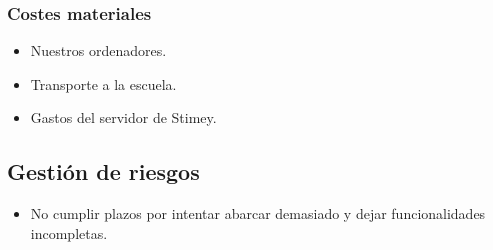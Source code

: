 \documentclass[12pt,letterpaper]{article}
\begin{document}
\subsubsection{Costes materiales}
\begin{itemize}
	\item Nuestros ordenadores.
	\item Transporte a la escuela.
	\item Gastos del servidor de Stimey.
\end{itemize}

\subsection{Gestión de riesgos}
\begin{itemize}
	\item No cumplir plazos por intentar abarcar demasiado y dejar funcionalidades incompletas.
\end{itemize}
\end{document}
